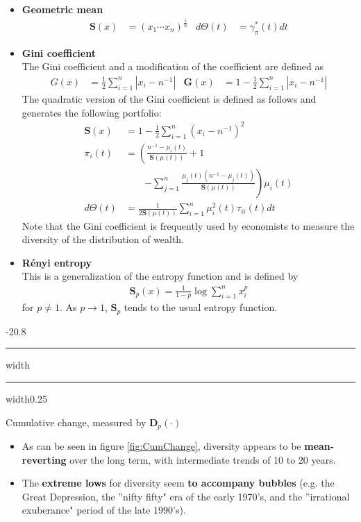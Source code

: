 \documentclass[a4paper,landscape,8pt,fleqn]{scrartcl}
\makeatletter
\renewcommand{\emph}[1]{\textbf{#1}}
\renewcommand{\subsection}{\@startsection{subsection}{1}{0mm}%
{-2\baselineskip}{0.8\baselineskip}%
{\hrule depth 0.2pt width\columnwidth\hrule depth0.75pt
width0.25\columnwidth\vspace*{1.2em}\large\bfseries}}
\makeatother
\begin{document}
\begin{multicols*}{3}
\begin{itemize}
\item \emph{Geometric mean}
\begin{align*}
\pmb{S}(x) &= (x_1 \cdots x_n)^\frac{1}{n} &d\Theta(t) &= \gamma_\pi^\ast(t) dt
\end{align*}
\item \emph{Gini coefficient} \\
The Gini coefficient and a modification of the coefficient are defined as
\begin{align*}
G(x) &= \frac{1}{2} \sum_{i=1}^n \left\lvert x_i - n^{-1} \right\rvert &
\pmb{G}(x) &= 1 - \frac{1}{2} \sum_{i=1}^n \left\lvert x_i - n^{-1} \right\rvert
\end{align*}
The quadratic version of the Gini coefficient is defined as follows and generates the following portfolio:
\begin{align*}
\pmb{S}(x) &= 1 - \frac{1}{2} \sum_{i=1}^n \left( x_i - n^{-1} \right)^2 \\
\pi_i(t) &= \left( \frac{n^{-1} - \mu_i(t)}{\pmb{S}(\mu(t))} + 1 \right. \\
& \qquad \left. - \sum_{j=1}^n \frac{\mu_j(t) \left( n^{-1} - \mu_j(t) \right)}{\pmb{S}(\mu(t))} \right) \mu_i(t) \\
d\Theta(t) &= \frac{1}{2 \pmb{S}(\mu(t))} \sum_{i=1}^n \mu_i^2(t) \tau_{i i}(t) dt
\end{align*}
Note that the Gini coefficient is frequently used by economists to measure the diversity of the distribution of wealth.
\item \emph{Rényi entropy} \\
This is a generalization of the entropy function and is defined by
\begin{align*}
\pmb{S}_p(x) = \frac{1}{1-p} \log \sum_{i=1}^n x_i^p
\end{align*}
for $p \neq 1$. As $p \to 1$, $\pmb{S}_p$ tends to the usual entropy function.
\end{itemize}

\subsection{Cumulative change, measured by $\pmb{D}_p(\cdot)$}

\begin{itemize}
\item As can be seen in figure \ref{fig:CumChange}, diversity appears to be \emph{mean-reverting} over the long term, with intermediate trends of 10 to 20 years.
\item The \emph{extreme lows} for diversity seem \emph{to accompany bubbles} (e.g. the Great Depression, the ''nifty fifty" era of the early 1970's, and the ''irrational exuberance" period of the late 1990's).
\end{itemize}


\end{multicols*}
\end{document}
